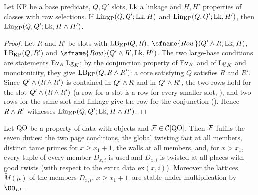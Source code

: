 \begin{lemma}\label{pf:sh-misc:rowLand}
Let $\mathrm{KP}$ be a base predicate, $Q,Q'$ slots, $\mathrm{Lk}$ a linkage and $H,H'$ properties of classes with raw
selections. If $\mathrm{Lin}_{\mathrm{KP}}(Q,Q';\mathrm{Lk},H)$ and $\mathrm{Lin}_{\mathrm{KP}}(Q,Q';\mathrm{Lk},H')$, then
$\mathrm{Lin}_{\mathrm{KP}}(Q,Q';\mathrm{Lk},H\wedge H')$.
\end{lemma}

\begin{proof}
Let $R$ and $R'$ be slots with $\mathrm{LB}_{\mathrm{KP}}(Q,R)$, $\sfname{Row}(Q'\shmiscand R,\shmiscLk,H)$, $\mathrm{LB}_{\mathrm{KP}}(Q,R')$
and $\sfname{Row}(Q'\shmiscand R',\shmiscLk,H')$. The two large-base conditions are statements $\mathrm{Ev}_K\,\mathrm{Lg}_K$; by
the conjunction property of $\mathrm{Ev}_K$ and of $\mathrm{Lg}_K$ and monotonicity, they give $\mathrm{LB}_{\mathrm{KP}}(Q,R\mathbin{\wedge} R')$:
a core satisfying $Q$ satisfies $R$ and $R'$. Since $Q'\mathbin{\wedge}(R\mathbin{\wedge} R')$ is contained in $Q'\mathbin{\wedge} R$ and in
$Q'\mathbin{\wedge} R'$, the two rows hold for the slot $Q'\mathbin{\wedge}(R\mathbin{\wedge} R')$ (a row for a slot is a row for every smaller
slot, ), and two rows for the same slot and linkage give the row for the conjunction
(). Hence $R\mathbin{\wedge} R'$ witnesses $\mathrm{Lin}_{\mathrm{KP}}(Q,Q';\mathrm{Lk},H\wedge H')$.
\end{proof}

\begin{lemma}\label{pf:sh-misc:duties}
Let $\mathrm{QO}$ be a property of data with objects and $\mathcal{F}\in\mathcal{C}[\mathrm{QO}]$. Then $\mathcal{F}$ fulfils the seven
duties: the two page conditions, the global twisting fact at all members, distinct tame primes for $x\ge x_1+1$, the
walls at all members, and, for $x>x_1$, every tuple of every member $D_{x,i}$ is used and $D_{x,i}$ is twisted at all places with
good twists (with respect to the extra data $\mathrm{ex}(x,i)$). Moreover the lattices $\widetilde M(\mu)$ of the members
$D_{x,i}$, $x\ge x_1+1$, are stable under multiplication by $\OO_{\mathit{LL}}$.
\end{lemma}

